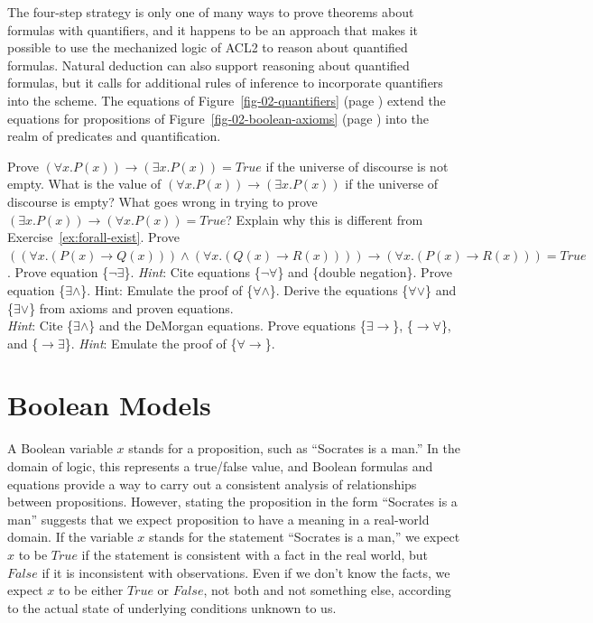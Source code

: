 {{The four-step strategy is only one of many ways to prove theorems about
formulas with quantifiers, and it happens to be an approach that makes
it possible to use the mechanized logic of ACL2
to reason about quantified formulas.
Natural deduction can also support reasoning about quantified formulas,
but it calls for additional rules of inference
to incorporate quantifiers into the scheme.
The equations of Figure~\ref{fig-02-quantifiers} (page \pageref{fig-02-quantifiers})
extend the equations for propositions of
Figure~\ref{fig-02-boolean-axioms} (page \pageref{fig-02-boolean-axioms})
into the realm of predicates and quantification.

\begin{ExerciseList}

\Exercise
\label{ex:forall-exist}
Prove $(\forall x.P(x)) \rightarrow (\exists x.P(x)) = True$ if the universe of discourse is not empty.
\Exercise What is the value of $(\forall x.P(x)) \rightarrow (\exists x.P(x))$ if the universe of discourse is empty?
\Exercise What goes wrong in trying to prove $(\exists x.P(x)) \rightarrow (\forall x.P(x)) = True$?
Explain why this is different from Exercise~\ref{ex:forall-exist}.
\Exercise Prove $((\forall x.(P(x){\rightarrow}Q(x))) \wedge (\forall x.(Q(x){\rightarrow}R(x)))) \rightarrow (\forall x.(P(x) {\rightarrow}R(x)))=True$.
\Exercise Prove equation \{$\neg\exists$\}. \emph{Hint}: Cite equations \{$\neg\forall$\} and \{double negation\}.
\Exercise Prove equation \{$\exists\wedge$\}. Hint: Emulate the proof of \{$\forall\wedge$\}.
\Exercise Derive the equations \{$\forall\vee$\} and \{$\exists\vee$\} from axioms and proven equations.\\
\emph{Hint}: Cite \{$\exists\wedge$\} and the DeMorgan equations.
\Exercise Prove equations \{${\exists}{\rightarrow}$\}, \{${\rightarrow}{\forall}$\}, and
\{${\rightarrow}{\exists}$\}. \emph{Hint}: Emulate the proof of \{${\forall}{\rightarrow}$\}.

\end{ExerciseList}

\section{Boolean Models}
\label{sec:boolean-models}

A Boolean variable $x$
stands for a proposition, such as ``Socrates is a man.''
In the domain of logic, this represents a true/false value,
and Boolean formulas and equations provide a way to carry out
a consistent analysis of relationships between propositions.
However, stating the proposition in the form ``Socrates is a man''
suggests that we expect proposition to have a meaning in a real-world domain.
If the variable $x$ stands for the statement ``Socrates is a man,''
we expect $x$ to be $True$ if the statement is consistent with a fact
in the real world, but $False$ if it is inconsistent with observations.
Even if we don't know the facts, we expect $x$ to be either $True$ or $False$,
not both and not something else,
according to the actual state of underlying conditions unknown to us.

}}
